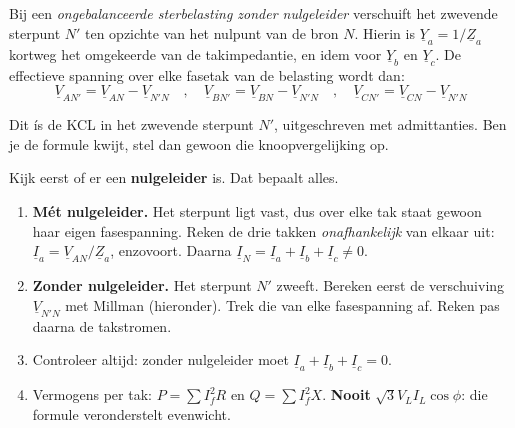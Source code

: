\documentclass[a4paper,11pt]{article}
\begin{document}
{Bij een \emph{ongebalanceerde sterbelasting zonder nulgeleider} verschuift het zwevende sterpunt $N'$
    ten opzichte van het nulpunt van de bron $N$. Hierin is $\underline{Y}_a = 1/\underline{Z}_a$
    kortweg het omgekeerde van de takimpedantie, en idem voor $\underline{Y}_b$ en $\underline{Y}_c$.
    De effectieve spanning over elke fasetak van de belasting wordt dan:
    \[\underline{V}_{AN'} = \underline{V}_{AN} - \underline{V}_{N'N} \quad , \quad
        \underline{V}_{BN'} = \underline{V}_{BN} - \underline{V}_{N'N} \quad , \quad
        \underline{V}_{CN'} = \underline{V}_{CN} - \underline{V}_{N'N}\]}

Dit \'is de KCL in het zwevende sterpunt $N'$, uitgeschreven met admittanties. Ben je de formule
kwijt, stel dan gewoon die knoopvergelijking op.

\begin{theorie}
    Kijk eerst of er een \textbf{nulgeleider} is. Dat bepaalt alles.
    \begin{enumerate}
        \item \textbf{Mét nulgeleider.} Het sterpunt ligt vast, dus over elke tak staat gewoon haar
              eigen fasespanning. Reken de drie takken \emph{onafhankelijk} van elkaar uit:
              $\underline{I}_a = \underline{V}_{AN}/\underline{Z}_a$, enzovoort. Daarna
              $\underline{I}_N = \underline{I}_a + \underline{I}_b + \underline{I}_c \neq 0$.
        \item \textbf{Zonder nulgeleider.} Het sterpunt $N'$ zweeft. Bereken eerst de verschuiving
              $\underline{V}_{N'N}$ met Millman (hieronder). Trek die van elke fasespanning af.
              Reken pas daarna de takstromen.
        \item Controleer altijd: zonder nulgeleider moet
              $\underline{I}_a + \underline{I}_b + \underline{I}_c = 0$.
        \item Vermogens per tak: $P = \sum I_f^2R$ en $Q = \sum I_f^2X$. \textbf{Nooit}
              $\sqrt{3}V_LI_L\cos\phi$: die formule veronderstelt evenwicht.
    \end{enumerate}
\end{theorie}
\end{document}
